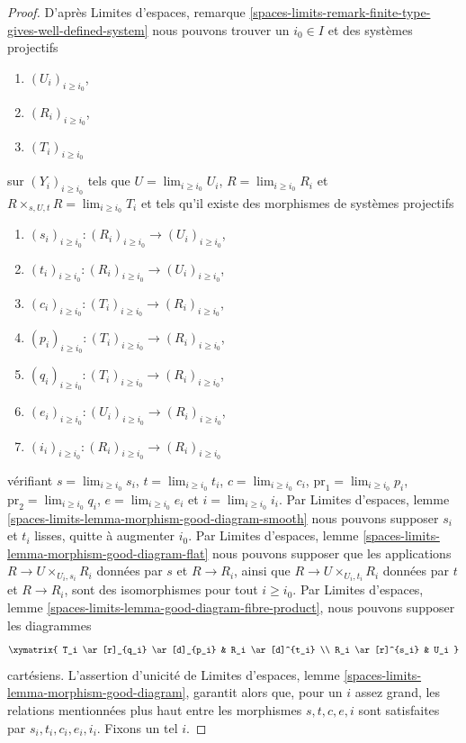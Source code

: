 \begin{proof}
\medskip\noindent
D'après Limites d'espaces, remarque
\ref{spaces-limits-remark-finite-type-gives-well-defined-system}
nous pouvons trouver un $i_0 \in I$ et des systèmes projectifs
\begin{enumerate}
\item $(U_i)_{i \geq i_0}$,
\item $(R_i)_{i \geq i_0}$,
\item $(T_i)_{i \geq i_0}$
\end{enumerate}
sur $(Y_i)_{i \geq i_0}$ tels que
$U = \lim_{i \geq i_0} U_i$,
$R = \lim_{i \geq i_0} R_i$ et
$R \times_{s, U, t} R = \lim_{i \geq i_0} T_i$
et tels qu'il existe des morphismes de systèmes projectifs
\begin{enumerate}
\item $(s_i)_{i \geq i_0} : (R_i)_{i \geq i_0} \to (U_i)_{i \geq i_0}$,
\item $(t_i)_{i \geq i_0} : (R_i)_{i \geq i_0} \to (U_i)_{i \geq i_0}$,
\item $(c_i)_{i \geq i_0} : (T_i)_{i \geq i_0} \to (R_i)_{i \geq i_0}$,
\item $(p_i)_{i \geq i_0} : (T_i)_{i \geq i_0} \to (R_i)_{i \geq i_0}$,
\item $(q_i)_{i \geq i_0} : (T_i)_{i \geq i_0} \to (R_i)_{i \geq i_0}$,
\item $(e_i)_{i \geq i_0} : (U_i)_{i \geq i_0} \to (R_i)_{i \geq i_0}$,
\item $(i_i)_{i \geq i_0} : (R_i)_{i \geq i_0} \to (R_i)_{i \geq i_0}$
\end{enumerate}
vérifiant
$s = \lim_{i \geq i_0} s_i$,
$t = \lim_{i \geq i_0} t_i$,
$c = \lim_{i \geq i_0} c_i$,
$\text{pr}_1 = \lim_{i \geq i_0} p_i$,
$\text{pr}_2 = \lim_{i \geq i_0} q_i$,
$e = \lim_{i \geq i_0} e_i$ et
$i = \lim_{i \geq i_0} i_i$.
Par Limites d'espaces, lemme
\ref{spaces-limits-lemma-morphism-good-diagram-smooth}
nous pouvons supposer $s_i$ et $t_i$ lisses, quitte à augmenter $i_0$.
Par Limites d'espaces, lemme
\ref{spaces-limits-lemma-morphism-good-diagram-flat}
nous pouvons supposer que les applications
$R \to U \times_{U_i, s_i} R_i$ données par $s$ et $R \to R_i$, ainsi que
$R \to U \times_{U_i, t_i} R_i$ données par $t$ et $R \to R_i$, sont des
isomorphismes pour tout $i \geq i_0$. Par Limites d'espaces, lemme
\ref{spaces-limits-lemma-good-diagram-fibre-product}, nous pouvons supposer les
diagrammes
$$
\xymatrix{
T_i \ar[r]_{q_i} \ar[d]_{p_i} & R_i \ar[d]^{t_i} \\
R_i \ar[r]^{s_i} & U_i
}
$$
cartésiens. L'assertion d'unicité de Limites d'espaces, lemme
\ref{spaces-limits-lemma-morphism-good-diagram}, garantit alors que, pour un
$i$ assez grand, les relations mentionnées plus haut entre les morphismes
$s, t, c, e, i$ sont satisfaites par $s_i, t_i, c_i, e_i, i_i$. Fixons un tel
$i$.


\end{proof}
